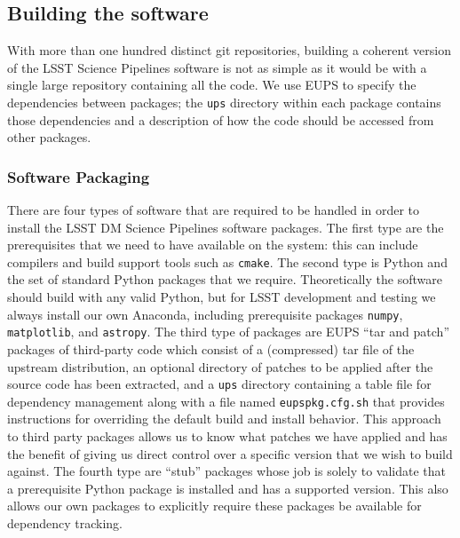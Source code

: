 \subsection{Building the software}
\label{sec:buildsw}

With more than one hundred distinct git repositories, building a coherent version of the LSST Science Pipelines software is not as simple as it would be with a single large repository containing all the code.
We use EUPS to specify the dependencies between packages; the \texttt{ups} directory within each package contains those dependencies and a description of how the code should be accessed from other packages.

\subsubsection{Software Packaging}

There are four types of software that are required to be handled in order to install the LSST DM Science Pipelines software packages.
The first type are the prerequisites that we need to have available on the system: this can include compilers and build support tools such as \texttt{cmake}.
The second type is Python and the set of standard Python packages that we require.
Theoretically the software should  build with any valid Python, but for LSST development and testing we always install our own Anaconda, including prerequisite packages \texttt{numpy}, \texttt{matplotlib}, and \texttt{astropy}\cite{2018arXiv180102634T}.
The third type of packages are EUPS ``tar and patch'' packages of third-party code
which  consist of a (compressed) tar file of the upstream distribution, an optional directory of patches to be applied after the source code has been extracted, and a \texttt{ups} directory containing a table file for dependency management along with a file named \texttt{eupspkg.cfg.sh} that provides instructions for overriding the default build and install behavior.
This approach to third party packages allows us to know what patches we have applied and has the benefit of giving us direct control over a specific version that we wish to build against.
The fourth type are ``stub'' packages whose job is solely to validate that a prerequisite Python package is installed and has a supported version.
This also allows our own packages to explicitly require these packages be available for dependency tracking.


